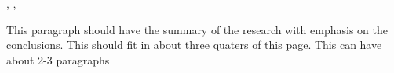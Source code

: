 \newpage
\thispagestyle{plain}
\begin{spacing}{1}

\begin{center} 
    {\expandafter\MakeUppercase{\textbf{\projectTitle}}}

    \vspace{2em}

    {\textbf{\nameWithInitials}}

    \vspace{1em}

    {\fontsize{10pt}{0pt}\selectfont
        \departmentName, \universityName, \universityCountry
    }   
\end{center}

\vspace{2em}

{This paragraph should have the summary of the research with emphasis on the conclusions. This should fit in about three quaters of this page. This can have about 2-3 paragraphs} 
 
\end{spacing}
